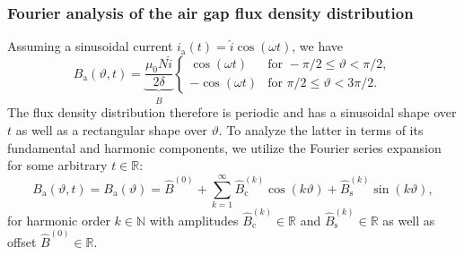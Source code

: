 \begin{frame}
	\frametitle{Fourier analysis of the air gap flux density distribution}
        Assuming a sinusoidal current $i_\mathrm{a}(t) = \hat{i} \cos(\omega t)$, we have
        \begin{equation}
            B_\mathrm{a}(\vartheta, t) = \underbrace{\frac{\mu_0 N \hat{i}}{2\delta}}_{\hat{B}} \begin{cases}
                \cos(\omega t) & \text{for } -\pi/2 \leq \vartheta < \pi/2, \\
                -\cos(\omega t) & \text{for } \pi/2 \leq \vartheta < 3\pi/2.
            \end{cases}
            \label{eq:B_single_phase_coil}
        \end{equation}
        \pause
        The flux density distribution therefore is periodic and has a sinusoidal shape over $t$ as well as a rectangular shape over $\vartheta$. \pause To analyze the latter in terms of its fundamental and harmonic components, we utilize the Fourier series expansion for some arbitrary $t\in\mathbb{R}$:
        \begin{equation}
            B_\mathrm{a}(\vartheta, t) =B_\mathrm{a}(\vartheta) = \hat{B}^{(0)} + \sum_{k=1}^{\infty} \hat{B}_{\mathrm{c}}^{(k)} \cos(k \vartheta) + \hat{B}_{\mathrm{s}}^{(k)} \sin(k \vartheta),
            \label{eq:fourier_series_B_single_phase_coil}
        \end{equation} 
        for harmonic order $k\in\mathbb{N}$ with amplitudes $\hat{B}_{\mathrm{c}}^{(k)}\in\mathbb{R}$ and $\hat{B}_{\mathrm{s}}^{(k)}\in\mathbb{R}$ as well as offset $\hat{B}^{(0)}\in\mathbb{R}$.
\end{frame}

